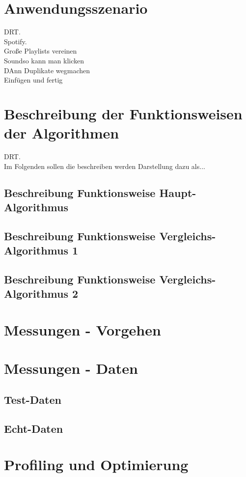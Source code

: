 \documentclass[
10pt, %
a4paper, %
oneside, %
headinclude,footinclude, %
BCOR5mm, %
]{scrartcl}
\begin{document}
\section{Anwendungsszenario}
DRT.\\
Spotify.\\
Große Playlists vereinen\\
Soundso kann man klicken\\
DAnn Duplikate wegmachen\\
Einfügen und fertig\\

\section{Beschreibung der Funktionsweisen der Algorithmen}
DRT.\\
Im Folgenden sollen die beschreiben werden Darstellung dazu als...\\
\subsection{Beschreibung Funktionsweise Haupt-Algorithmus}

\subsection{Beschreibung Funktionsweise Vergleichs-Algorithmus 1}
\subsection{Beschreibung Funktionsweise Vergleichs-Algorithmus 2}
\section{Messungen - Vorgehen}
\section{Messungen - Daten}
\subsection{Test-Daten}
\subsection{Echt-Daten}
\section{Profiling und Optimierung}
\end{document}
